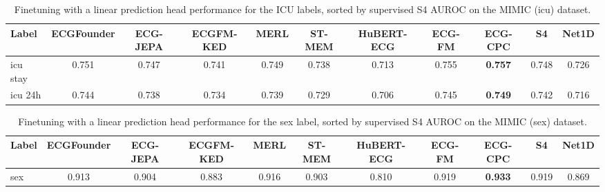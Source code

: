 \documentclass{article}
\begin{document}
                \begin{table}[htbp]
                    \centering
                    \tiny
                    \setlength{\tabcolsep}{2pt}
                    \caption{Finetuning with a linear prediction head performance for the ICU labels, sorted by supervised S4 AUROC on the MIMIC (icu) dataset.}
                    \begin{tabular}{lcccccccccc}
                        \toprule
                        \textbf{Label} & \textbf{ECGFounder} & \textbf{ECG-JEPA} & \textbf{ECGFM-KED} & \textbf{MERL} & \textbf{ST-MEM} & \textbf{HuBERT-ECG} & \textbf{ECG-FM} & \textbf{ECG-CPC} & \textbf{S4} & \textbf{Net1D} \\
                        \midrule
                        icu stay & 0.751 & 0.747 & 0.741 & 0.749 & 0.738 & 0.713 & 0.755 & \textbf{0.757} & 0.748 & 0.726 \\
                        icu 24h & 0.744 & 0.738 & 0.734 & 0.739 & 0.729 & 0.706 & 0.745 & \textbf{0.749} & 0.742 & 0.716 \\
                        \bottomrule
                    \end{tabular}
                    \label{tab:results_overview_icu}
                \end{table}

                \begin{table}[htbp]
                    \centering
                    \tiny
                    \setlength{\tabcolsep}{2pt}
                    \caption{Finetuning with a linear prediction head performance for the sex label, sorted by supervised S4 AUROC on the MIMIC (sex) dataset.}
                    \begin{tabular}{lcccccccccc}
                        \toprule
                        \textbf{Label} & \textbf{ECGFounder} & \textbf{ECG-JEPA} & \textbf{ECGFM-KED} & \textbf{MERL} & \textbf{ST-MEM} & \textbf{HuBERT-ECG} & \textbf{ECG-FM} & \textbf{ECG-CPC} & \textbf{S4} & \textbf{Net1D} \\
                        \midrule
                        sex & 0.913 & 0.904 & 0.883 & 0.916 & 0.903 & 0.810 & 0.919 & \textbf{0.933} & 0.919 & 0.869 \\
                        \bottomrule
                    \end{tabular}
                    \label{tab:results_overview_sex}
                \end{table}
                
\end{document}
